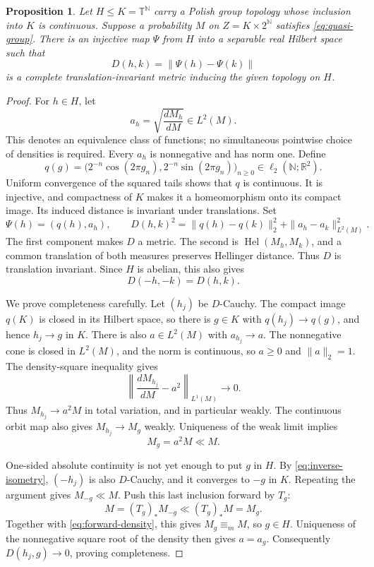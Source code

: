 \documentclass[11pt]{article}
\newtheorem{proposition}[theorem]{Proposition}
\theoremstyle{definition}
\newcommand{\N}{\mathbb N}
\newcommand{\R}{\mathbb R}
\newcommand{\T}{\mathbb T}
\newcommand{\ME}{\mathrel{\equiv_m}}
\newcommand{\Hel}{\operatorname{Hel}}
\begin{document}
\begin{proposition}\label{prop:Hilbert-metric}
Let $H\le K=\T^\N$ carry a Polish group topology whose inclusion into
$K$ is continuous. Suppose a probability $M$ on $Z=K\times2^\N$
satisfies \eqref{eq:quasi-group}. There is an injective map $\Psi$ from
$H$ into a separable real Hilbert space such that
\[
 D(h,k)=\|\Psi(h)-\Psi(k)\|
\]
is a complete translation-invariant metric inducing the given topology
on $H$.
\end{proposition}
\begin{proof}
For $h\in H$, let
\[
 a_h=\sqrt{\frac{dM_h}{dM}}\in L^2(M).
\]
This denotes an equivalence class of functions; no simultaneous
pointwise choice of densities is required. Every $a_h$ is nonnegative
and has norm one. Define
\[
 q(g)=\bigl(2^{-n}\cos(2\pi g_n),
             2^{-n}\sin(2\pi g_n)\bigr)_{n\ge0}\in\ell_2(\N;\R^2).
\]
Uniform convergence of the squared tails shows that $q$ is continuous.
It is injective, and compactness of $K$ makes it a homeomorphism onto
its compact image. Its induced distance is invariant under translations.
Set
\[
 \Psi(h)=(q(h),a_h),\qquad
 D(h,k)^2=\|q(h)-q(k)\|_2^2+\|a_h-a_k\|_{L^2(M)}^2.
\]
The first component makes $D$ a metric. The second is
$\Hel(M_h,M_k)$, and a common translation of both measures preserves
Hellinger distance. Thus $D$ is translation invariant. Since $H$ is
abelian, this also gives
\begin{equation}\label{eq:inverse-isometry}
 D(-h,-k)=D(h,k).
\end{equation}

We prove completeness carefully. Let $(h_j)$ be $D$-Cauchy. The compact
image $q(K)$ is closed in its Hilbert space, so there is $g\in K$ with
$q(h_j)\to q(g)$, and hence $h_j\to g$ in $K$. There is also
$a\in L^2(M)$ with $a_{h_j}\to a$. The nonnegative cone is closed
in $L^2(M)$, and the norm is continuous, so $a\ge0$ and $\|a\|_2=1$.
The density-square inequality gives
\[
 \left\|\frac{dM_{h_j}}{dM}-a^2\right\|_{L^1(M)}\longrightarrow0.
\]
Thus $M_{h_j}\to a^2M$ in total variation, and in particular weakly.
The continuous orbit map also gives $M_{h_j}\to M_g$ weakly. Uniqueness
of the weak limit implies
\begin{equation}\label{eq:forward-density}
 M_g=a^2M\ll M.
\end{equation}

One-sided absolute continuity is not yet enough to put $g$ in $H$.
By \eqref{eq:inverse-isometry}, $(-h_j)$ is also $D$-Cauchy, and it
converges to $-g$ in $K$. Repeating the argument gives $M_{-g}\ll M$.
Push this last inclusion forward by $T_g$:
\[
 M=(T_g)_*M_{-g}\ll (T_g)_*M=M_g.
\]
Together with \eqref{eq:forward-density}, this gives $M_g\ME M$,
so $g\in H$. Uniqueness of the nonnegative square root of the density
then gives $a=a_g$. Consequently $D(h_j,g)\to0$, proving completeness.


\end{proof}
\end{document}
